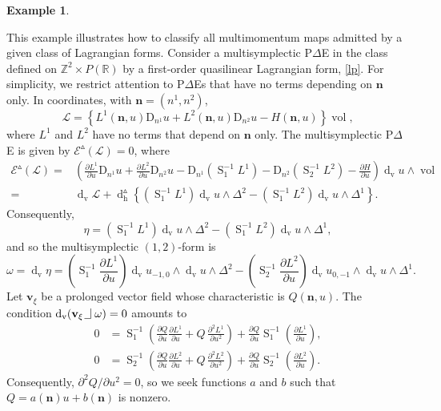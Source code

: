 \documentclass[11pt]{article} %
\numberwithin{equation}{section}
\newcommand{\intpsym}{\,\, \setlength{\unitlength}{0.4mm}
	\begin{picture}(0, 0)(5, 5)%
	\put(0, 4){\line(1,0){5}} \put(5,4){\line(0,1){8}}
	\end{picture}\,\,}
\newcommand{\intp}{\,\,\intpsym}
\newcommand{\es}{\operatorname{S}}
\newcommand{\volf}{\operatorname{vol}}
\newcommand{\upd}{\operatorname{d}}
\newcommand{\uph}{\operatorname{h}}
\newcommand{\upv}{\operatorname{v}}
\newcommand{\dv}{\upd_{\upv}\!}
\newcommand{\diff}[1]{\mathrm{D}_{n^{#1}}}
\newcommand{\mbn}{\mathbf{n}}
\newcommand{\mbv}{\mathbf{v}}
\newcommand{\mcE}{\mathcal{E}}
\newcommand{\msL}{\mathscr{L}}
\newcommand{\dDh}{\upd^{\vartriangle}_{\uph}}
\theoremstyle{plain}
\theoremstyle{definition}
\newtheorem{exm}[defn]{Example}
\begin{document}
\begin{exm}\label{exm52}

This example illustrates how to classify all multimomentum maps admitted by a given class of Lagrangian forms. Consider a multisymplectic P$\Delta$E in the class defined on $\mathbb{Z}^2\times P(\mathbb{R})$ by a first-order quasilinear Lagrangian form, \eqref{lp}. For simplicity, we restrict attention to P$\Delta$Es that have no terms depending on $\mbn$ only. In coordinates, with $\mbn=(n^1,n^2)$,
\begin{equation}
\msL =\left\{L^1(\mbn,u)\diff{1}u+L^2(\mbn,u)\diff{2}u-H(\mbn,u)\right\}\volf,
\end{equation}
where $L^1$ and $L^2$ have no terms that depend on $\mbn$ only. The multisymplectic P$\Delta$E is given by $\mcE^{\vartriangle}(\msL)=0$, where
\begin{align}
\mcE^{\vartriangle}(\msL)=&\left(\frac{\partial L^1}{\partial u}\diff{1}u+\frac{\partial L^2}{\partial u}\diff{2}u-\diff{1}(\es_{1}^{-1}\!L^1)-\diff{2}(\es_{2}^{-1}\!L^2)-\frac{\partial H}{\partial u}\right)\dv u\wedge \volf\\
=& \dv \msL +\dDh\left\{\left(\es_1^{-1}\! L^1\right)\dv u\wedge \Delta^2-\left(\es_1^{-1}\!L^2\right)\dv u\wedge \Delta^1\right\}.\nonumber
\end{align}
Consequently,
\begin{equation}
    \eta=\left(\es_1^{-1}L^1\right)\dv u\wedge \Delta^2-\left(\es_1^{-1}L^2\right)\dv u\wedge \Delta^1,
\end{equation}
and so the multisymplectic $(1,2)$-form is 
\begin{equation}
\omega = \dv \eta=\left(\es_{1}^{-1}\frac{\partial L^1}{\partial u}\right)\dv u_{-1,0}\wedge\dv 
u\wedge\Delta^2- \left(\es_{2}^{-1}\frac{\partial L^2}{\partial u}\right)\dv u_{0,-1}\wedge\dv u
\wedge\Delta^1.
\end{equation}
Let  $\mbv_{\xi}$ be a prolonged vector field whose characteristic is $Q(\mbn,u)$. The condition
$\dv \left(\mbv_{\xi}\intp\omega\right)=0$ amounts to
\begin{equation}\label{ex2pres}
\begin{aligned}
   0&=\es_1^{-1}\!\left(\frac{\partial Q}{\partial u}\frac{\partial L^1}{\partial u}+Q\,\frac{\partial^2 L^1}{\partial u^2}\right)+\frac{\partial Q}{\partial u}\es_1^{-1}\!\left(\frac{\partial L^1}{\partial u}\right),\\
   0&=\es_2^{-1}\!\left(\frac{\partial Q}{\partial u}\frac{\partial L^2}{\partial u}+Q\,\frac{\partial^2 L^2}{\partial u^2}\right)+\frac{\partial Q}{\partial u}\es_2^{-1}\!\left(\frac{\partial L^2}{\partial u}\right).
\end{aligned}
\end{equation}
Consequently, $\partial^2 Q/\partial u^2=0$, so we seek functions $a$ and $b$ such that $Q=a(\mbn)u+b(\mbn)$ is nonzero.


\end{exm}
\end{document}
